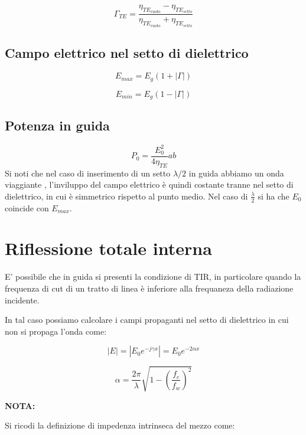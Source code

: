 \documentclass[10pt,a4paper]{report}
\begin{document}
			\begin{equation}
			\Gamma_{TE}=\frac{\eta_{TE_{vuoto}}-\eta_{TE_{setto}}}{\eta_{TE_{vuoto}}+\eta_{TE_{setto}}}
			\end{equation}
		\subsection{Campo elettrico nel setto di dielettrico}
		\begin{equation}
		E_{max}=E_g(1+|\Gamma|)
		\end{equation}

		\begin{equation}
		E_{min}=E_g(1-|\Gamma|)
		\end{equation}


		\subsection{Potenza in guida}
				\begin{equation}
				P_0=\frac{E_0^2}{4\eta_{TE}}ab
				\end{equation}
				Si noti che nel caso di inserimento di un setto $\lambda/2$ in guida abbiamo un onda viaggiante , l'inviluppo del campo elettrico è quindi costante tranne nel setto di dielettrico, in cui è simmetrico rispetto al punto medio.
				Nel caso di $\frac{\lambda}{2}$ si ha che $E_0$ coincide con $E_{max}$.
	\section{Riflessione totale interna}

		E' possibile che in guida si presenti la condizione di TIR, in particolare quando la frequenza di cut di un tratto di linea è inferiore alla frequaneza della radiazione incidente.

		In tal caso possiamo calcolare i campi propaganti nel setto di dielettrico in cui non si propaga l'onda come:


		\begin{equation}
		|E|=|E_0 e^{-j\gamma x}|=E_0 e^{- 2 \alpha x}
		\end{equation}


		\begin{equation}
		\alpha=\frac{2 \pi}{\lambda}\sqrt{1-(\frac{f_c}{f_w})^2}
		\end{equation}


		\textbf{NOTA:}

		Si ricodi la definizione di impedenza intrinseca del mezzo come:
\end{document}
